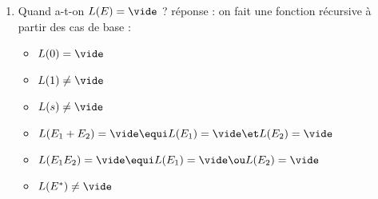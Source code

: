 \begin{enumerate}
\item
Quand a-t-on $L(E) = \vide$ ? réponse : on fait une fonction récursive à partir des cas de base : 
\begin{itemize}
	\item $L(0) = \vide$\\
	\item $L(1) \neq \vide$\\
	\item $L(s) \neq \vide$\\
	\item $L(E_1 + E_2) = \vide \equi L(E_1) = \vide \et L(E_2) = \vide$
	\item $L(E_1E_2) = \vide \equi L(E_1) = \vide \ou L(E_2) = \vide$
	\item $L(E^*) \neq \vide$
\end{itemize}

\end{enumerate}

